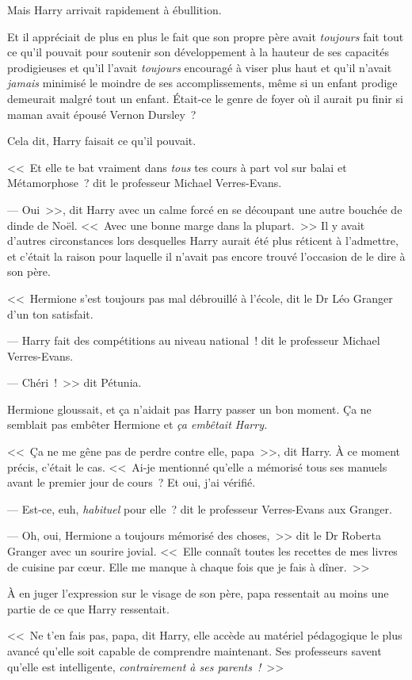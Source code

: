 Mais Harry arrivait rapidement à ébullition.

Et il appréciait de plus en plus le fait que son propre père avait \emph{toujours} fait tout ce qu'il pouvait pour soutenir son développement à la hauteur de ses capacités prodigieuses et qu'il l'avait \emph{toujours} encouragé à viser plus haut et qu'il n'avait \emph{jamais} minimisé le moindre de ses accomplissements, même si un enfant prodige demeurait malgré tout un enfant. Était-ce le genre de foyer où il aurait pu finir si maman avait épousé Vernon Dursley~?

Cela dit, Harry faisait ce qu'il pouvait.

<<~Et elle te bat vraiment dans \emph{tous} tes cours à part vol sur balai et Métamorphose~? dit le professeur Michael Verres-Evans.

--- Oui~>>, dit Harry avec un calme forcé en se découpant une autre bouchée de dinde de Noël. <<~Avec une bonne marge dans la plupart.~>> Il y avait d'autres circonstances lors desquelles Harry aurait été plus réticent à l'admettre, et c'était la raison pour laquelle il n'avait pas encore trouvé l'occasion de le dire à son père.

<<~Hermione s'est toujours pas mal débrouillé à l'école, dit le Dr Léo Granger d'un ton satisfait.

--- Harry fait des compétitions au niveau national~! dit le professeur Michael Verres-Evans.

--- Chéri~!~>> dit Pétunia.

Hermione gloussait, et ça n'aidait pas Harry passer un bon moment. Ça ne semblait pas embêter Hermione et \emph{ça embêtait Harry.}

<<~Ça ne me gêne pas de perdre contre elle, papa~>>, dit Harry. À ce moment précis, c'était le cas. <<~Ai-je mentionné qu'elle a mémorisé tous ses manuels avant le premier jour de cours~? Et oui, j'ai vérifié.

--- Est-ce, euh, \emph{habituel} pour elle~? dit le professeur Verres-Evans aux Granger.

--- Oh, oui, Hermione a toujours mémorisé des choses,~>> dit le Dr Roberta Granger avec un sourire jovial. <<~Elle connaît toutes les recettes de mes livres de cuisine par cœur. Elle me manque à chaque fois que je fais à dîner.~>>

À en juger l'expression sur le visage de son père, papa ressentait au moins une partie de ce que Harry ressentait.

<<~Ne t'en fais pas, papa, dit Harry, elle accède au matériel pédagogique le plus avancé qu'elle soit capable de comprendre maintenant. Ses professeurs savent qu'elle est intelligente, \emph{contrairement à ses parents~!}~>>

